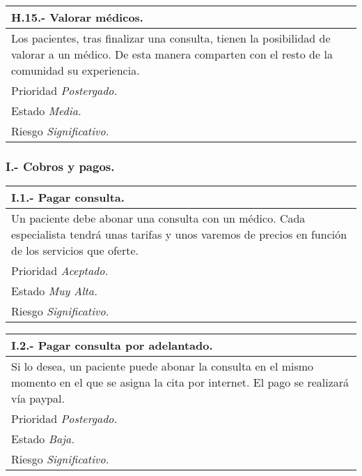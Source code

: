 	\begin{center}
	\begin{tabulary}{15cm}{|L|}
		\hline
			\bf{H.15.- Valorar médicos.} \\
		\hline
			Los pacientes, tras finalizar una consulta, tienen la posibilidad de valorar a un médico. De esta manera comparten con el resto de la comunidad su experiencia. \\
		\hline
			Prioridad \textit{Postergado.} \\
		\hline
			Estado \textit{Media.} \\
		\hline
			Riesgo \textit{Significativo.} \\
		\hline
	\end{tabulary}
	\end{center}


	\subsubsection{I.- Cobros y pagos.}

	\begin{center}
	\begin{tabulary}{15cm}{|L|}
		\hline
			\bf{I.1.- Pagar consulta.} \\
		\hline
			Un paciente debe abonar una consulta con un médico. Cada especialista tendrá unas tarifas y unos varemos de precios en función de los servicios que oferte.  \\
		\hline
			Prioridad \textit{Aceptado.} \\
		\hline
			Estado \textit{Muy Alta.} \\
		\hline
			Riesgo \textit{Significativo.} \\
		\hline
	\end{tabulary}
	\end{center}

	\begin{center}
	\begin{tabulary}{15cm}{|L|}
		\hline
			\bf{I.2.- Pagar consulta por adelantado.} \\
		\hline
			Si lo desea, un paciente puede abonar la consulta en el mismo momento en el que se asigna la cita por internet. El pago se realizará vía paypal. \\
		\hline
			Prioridad \textit{Postergado.} \\
		\hline
			Estado \textit{Baja.} \\
		\hline
			Riesgo \textit{Significativo.} \\
		\hline
	\end{tabulary}
	\end{center}

